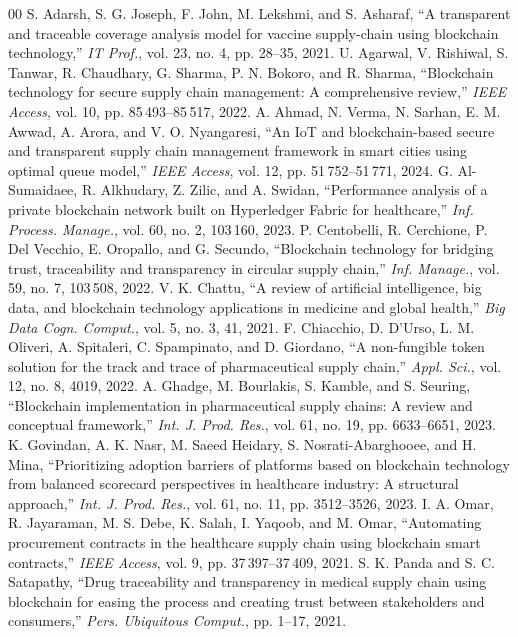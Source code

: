 \documentclass[conference]{IEEEtran}
\begin{document}
\begin{thebibliography}{00}
 S. Adarsh, S. G. Joseph, F. John, M. Lekshmi, and S. Asharaf, ``A transparent and traceable coverage analysis model for vaccine supply-chain using blockchain technology,'' \textit{IT Prof.}, vol. 23, no. 4, pp. 28--35, 2021.
 U. Agarwal, V. Rishiwal, S. Tanwar, R. Chaudhary, G. Sharma, P. N. Bokoro, and R. Sharma, ``Blockchain technology for secure supply chain management: A comprehensive review,'' \textit{IEEE Access}, vol. 10, pp. 85\,493--85\,517, 2022.
 A. Ahmad, N. Verma, N. Sarhan, E. M. Awwad, A. Arora, and V. O. Nyangaresi, ``An IoT and blockchain-based secure and transparent supply chain management framework in smart cities using optimal queue model,'' \textit{IEEE Access}, vol. 12, pp. 51\,752--51\,771, 2024.
 G. Al-Sumaidaee, R. Alkhudary, Z. Zilic, and A. Swidan, ``Performance analysis of a private blockchain network built on Hyperledger Fabric for healthcare,'' \textit{Inf. Process. Manage.}, vol. 60, no. 2, 103\,160, 2023.
 P. Centobelli, R. Cerchione, P. Del Vecchio, E. Oropallo, and G. Secundo, ``Blockchain technology for bridging trust, traceability and transparency in circular supply chain,'' \textit{Inf. Manage.}, vol. 59, no. 7, 103\,508, 2022.
 V. K. Chattu, ``A review of artificial intelligence, big data, and blockchain technology applications in medicine and global health,'' \textit{Big Data Cogn. Comput.}, vol. 5, no. 3, 41, 2021.
 F. Chiacchio, D. D'Urso, L. M. Oliveri, A. Spitaleri, C. Spampinato, and D. Giordano, ``A non-fungible token solution for the track and trace of pharmaceutical supply chain,'' \textit{Appl. Sci.}, vol. 12, no. 8, 4019, 2022.
 A. Ghadge, M. Bourlakis, S. Kamble, and S. Seuring, ``Blockchain implementation in pharmaceutical supply chains: A review and conceptual framework,'' \textit{Int. J. Prod. Res.}, vol. 61, no. 19, pp. 6633--6651, 2023.
 K. Govindan, A. K. Nasr, M. Saeed Heidary, S. Nosrati-Abarghooee, and H. Mina, ``Prioritizing adoption barriers of platforms based on blockchain technology from balanced scorecard perspectives in healthcare industry: A structural approach,'' \textit{Int. J. Prod. Res.}, vol. 61, no. 11, pp. 3512--3526, 2023.
 I. A. Omar, R. Jayaraman, M. S. Debe, K. Salah, I. Yaqoob, and M. Omar, ``Automating procurement contracts in the healthcare supply chain using blockchain smart contracts,'' \textit{IEEE Access}, vol. 9, pp. 37\,397--37\,409, 2021.
 S. K. Panda and S. C. Satapathy, ``Drug traceability and transparency in medical supply chain using blockchain for easing the process and creating trust between stakeholders and consumers,'' \textit{Pers. Ubiquitous Comput.}, pp. 1--17, 2021.

\end{thebibliography}
\end{document}

